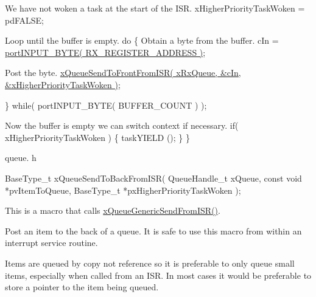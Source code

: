 \begin{DoxyPre}We have not woken a task at the start of the ISR.
    xHigherPriorityTaskWoken = pdFALSE;\end{DoxyPre}



\begin{DoxyPre}Loop until the buffer is empty.
    do
    \{
Obtain a byte from the buffer.
        cIn = \hyperlink{Paradigm_2Tern__EE_2small_2portmacro_8h_a59a2f5fb8ded86c79cd56e2a3357340b}{portINPUT\_BYTE( RX\_REGISTER\_ADDRESS )};\end{DoxyPre}



\begin{DoxyPre}Post the byte.
        \hyperlink{queue_8h_af03b83396462affe9e28302660e7b9c6}{xQueueSendToFrontFromISR( xRxQueue, &cIn, &xHigherPriorityTaskWoken )};\end{DoxyPre}



\begin{DoxyPre}    \} while( portINPUT\_BYTE( BUFFER\_COUNT ) );\end{DoxyPre}



\begin{DoxyPre}Now the buffer is empty we can switch context if necessary.
    if( xHigherPriorityTaskWoken )
    \{
        taskYIELD ();
    \}
 \}
 \end{DoxyPre}


queue. h 
\begin{DoxyPre}
 BaseType\_t xQueueSendToBackFromISR(
                                         QueueHandle\_t xQueue,
                                         const void *pvItemToQueue,
                                         BaseType\_t *pxHigherPriorityTaskWoken
                                      );
 \end{DoxyPre}


This is a macro that calls \hyperlink{queue_8h_a263711eb0124112e828a18fd4b8ab29d}{x\-Queue\-Generic\-Send\-From\-I\-S\-R()}.

Post an item to the back of a queue. It is safe to use this macro from within an interrupt service routine.

Items are queued by copy not reference so it is preferable to only queue small items, especially when called from an I\-S\-R. In most cases it would be preferable to store a pointer to the item being queued.


